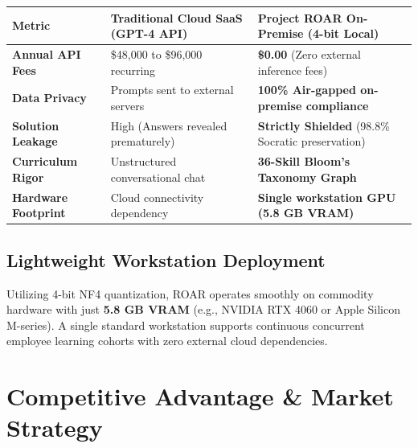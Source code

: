 \documentclass[11pt,a4paper]{article}
\begin{document}
\vspace{1pt}
\begin{table}[htbp]
  \centering
  \footnotesize
  \label{tab:economics}
  \vspace{2pt}
  \begin{tabularx}{\textwidth}{@{}lXX@{}}
    \toprule
    \textbf{Metric} & \textbf{Traditional Cloud SaaS (GPT-4 API)} & \textbf{Project ROAR On-Premise (4-bit Local)} \\
    \midrule
    \textbf{Annual API Fees} & \$48,000 to \$96,000 recurring & \textbf{\$0.00} (Zero external inference fees) \\
    \textbf{Data Privacy} & Prompts sent to external servers & \textbf{100\% Air-gapped on-premise compliance} \\
    \textbf{Solution Leakage} & High (Answers revealed prematurely) & \textbf{Strictly Shielded} (98.8\% Socratic preservation) \\
    \textbf{Curriculum Rigor} & Unstructured conversational chat & \textbf{36-Skill Bloom's Taxonomy Graph} \\
    \textbf{Hardware Footprint} & Cloud connectivity dependency & \textbf{Single workstation GPU (5.8 GB VRAM)} \\
    \bottomrule
  \end{tabularx}
\end{table}

\vspace{-4pt}

\subsection{Lightweight Workstation Deployment}
Utilizing 4-bit NF4 quantization, ROAR operates smoothly on commodity hardware with just \textbf{5.8 GB VRAM} (e.g., NVIDIA RTX 4060 or Apple Silicon M-series). A single standard workstation supports continuous concurrent employee learning cohorts with zero external cloud dependencies.

\section{Competitive Advantage \& Market Strategy}
\end{document}
